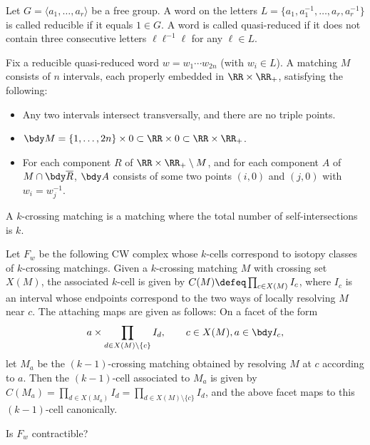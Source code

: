 Let $G=\langle a_1,\dots,a_r\rangle$ be a free group. A word on the
  letters $L=\{a_1,a_1^{-1},\dots,a_r,a_r^{-1}\}$ is called reducible
  if it equals $1\in G$. A word is called quasi-reduced if it does not
  contain three consecutive letters $\ell\ell^{-1}\ell$ for any
  $\ell \in L$.

  Fix a reducible quasi-reduced word $w=w_1\cdots w_{2n}$ (with $w_i\in L$). A
  matching $M$ consists of $n$ intervals, each properly embedded in
  $\RR\times\RR_+$, satisfying the following:
  \begin{itemize}[leftmargin=*]
  \item Any two intervals intersect
    transversally, and there are no triple points.
  \item $\bdy M=\{1,\dots,2n\}\times 0\subset\RR\times 0\subset
    \RR\times\RR_+$.
  \item For each component $R$ of
    $\RR\times\RR_+\setminus M$, and for each component $A$ of $M\cap \bdy\overline{R}$, $\bdy A$ consists of some two points $(i,0)$ and $(j,0)$ with $w_i=w_j^{-1}$. 
  \end{itemize}
  A $k$-crossing
  matching is a matching where the total number of self-intersections
  is $k$.

  Let $F_w$ be the following CW complex whose $k$-cells correspond to
  isotopy classes of $k$-crossing matchings. Given a $k$-crossing
  matching $M$ with crossing set $X(M)$, the associated $k$-cell is
  given by $C(M)\defeq \prod_{c\in X(M)}I_c$, where $I_c$ is an
  interval whose endpoints correspond to the two ways of locally
  resolving $M$ near $c$. The attaching maps are given as follows: On
  a facet of the form
  \[
    a\times\prod_{d\in X(M)\setminus\{c\}}I_{d},\qquad c\in X(M),a\in \bdy I_c,
  \]
  let $M_a$ be the $(k-1)$-crossing matching obtained by resolving $M$
  at $c$ according to $a$. Then the $(k-1)$-cell associated to $M_a$
  is given by
  $C(M_a)=\prod_{d\in X(M_a)}I_d=\prod_{d\in X(M)\setminus\{c\}}I_{d}$, and the
  above facet maps to this $(k-1)$-cell canonically.

  Is $F_w$ contractible?